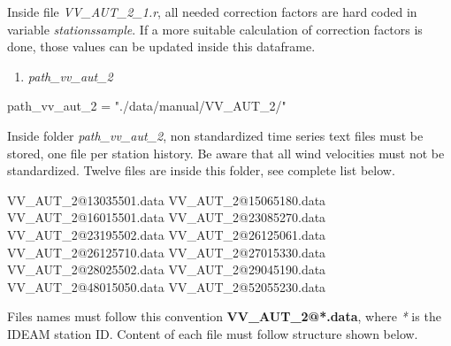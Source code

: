 \documentclass[12pt,oneside]{reedthesis}
\newenvironment{Shaded}{\begin{snugshade}}{\end{snugshade}}
\newcommand{\DecValTok}[1]{\textcolor[rgb]{0.00,0.00,0.81}{#1}}
\newcommand{\ExtensionTok}[1]{#1}
\newcommand{\NormalTok}[1]{#1}
\newcommand{\StringTok}[1]{\textcolor[rgb]{0.31,0.60,0.02}{#1}}
\providecommand{\tightlist}{%
  \setlength{\itemsep}{0pt}\setlength{\parskip}{0pt}}
\begin{document}
Inside file \emph{VV\_AUT\_2\_1.r}, all needed correction factors are hard coded in variable \emph{stationssample}. If a more suitable calculation of correction factors is done, those values can be updated inside this dataframe.
\begin{enumerate}
\def\labelenumi{\arabic{enumi}.}
\setcounter{enumi}{1}
\tightlist
\item
  \emph{path\_vv\_aut\_2}
\end{enumerate}
\scriptsize

\vspace{0.4cm}
\begin{Shaded}
\begin{Highlighting}[]
\NormalTok{      path_vv_aut_}\DecValTok{2}\NormalTok{ =}\StringTok{ "./data/manual/VV_AUT_2/"}
\end{Highlighting}
\end{Shaded}
\normalsize

Inside folder \emph{path\_vv\_aut\_2}, non standardized time series text files must be stored, one file per station history. Be aware that all wind velocities must not be standardized. Twelve files are inside this folder, see complete list below.

\scriptsize

\vspace{0.4cm}
\begin{Shaded}
\begin{Highlighting}[]
      \ExtensionTok{VV_AUT_2@13035501.data}
      \ExtensionTok{VV_AUT_2@15065180.data}
      \ExtensionTok{VV_AUT_2@16015501.data}
      \ExtensionTok{VV_AUT_2@23085270.data}
      \ExtensionTok{VV_AUT_2@23195502.data}
      \ExtensionTok{VV_AUT_2@26125061.data}
      \ExtensionTok{VV_AUT_2@26125710.data}
      \ExtensionTok{VV_AUT_2@27015330.data}
      \ExtensionTok{VV_AUT_2@28025502.data}
      \ExtensionTok{VV_AUT_2@29045190.data}
      \ExtensionTok{VV_AUT_2@48015050.data}
      \ExtensionTok{VV_AUT_2@52055230.data}
\end{Highlighting}
\end{Shaded}
\normalsize

Files names must follow this convention \textbf{VV\_AUT\_2@*.data}, where \emph{*} is the IDEAM station ID. Content of each file must follow structure shown below.

\scriptsize
\end{document}
